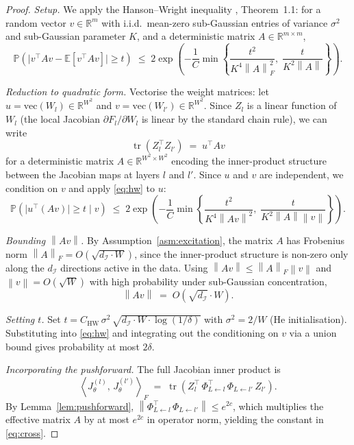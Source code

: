 \documentclass[11pt]{article}
\theoremstyle{plain}
\theoremstyle{definition}
\theoremstyle{remark}
\newcommand{\R}{\mathbb{R}}
\newcommand{\E}{\mathbb{E}}
\newcommand{\Prob}{\mathbb{P}}
\newcommand{\norm}[1]{\left\|#1\right\|}
\newcommand{\inner}[2]{\left\langle #1,\, #2 \right\rangle}
\newcommand{\tr}{\operatorname{tr}}
\newcommand{\dI}{d_{\mathcal{I}}}
\begin{document}
\begin{proof}
\textit{Setup.}
We apply the Hanson--Wright inequality \citep{rudelson2013}, Theorem~1.1:
for a random vector $v\in\R^m$ with i.i.d.\ mean-zero sub-Gaussian entries
of variance $\sigma^2$ and sub-Gaussian parameter $K$, and a deterministic
matrix $A\in\R^{m\times m}$,
\begin{equation}
\label{eq:hw}
  \Prob\!\left(\bigl|v^\top Av - \E[v^\top Av]\bigr|\geq t\right)
  \;\leq\;
  2\exp\!\left(-\frac{1}{C}\min\!\left\{
    \frac{t^2}{K^4\norm{A}_F^2},\;
    \frac{t}{K^2\norm{A}}
  \right\}\right).
\end{equation}

\textit{Reduction to quadratic form.}
Vectorise the weight matrices: let $u=\mathrm{vec}(W_l)\in\R^{W^2}$ and
$v=\mathrm{vec}(W_{l'})\in\R^{W^2}$.  Since $Z_l$ is a linear function of
$W_l$ (the local Jacobian $\partial F_l/\partial W_l$ is linear by the
standard chain rule), we can write
\[
  \tr\!\left(Z_l^\top Z_{l'}\right) \;=\; u^\top A v
\]
for a deterministic matrix $A\in\R^{W^2\times W^2}$ encoding the
inner-product structure between the Jacobian maps at layers $l$ and $l'$.
Since $u$ and $v$ are independent, we condition on $v$ and apply
\eqref{eq:hw} to $u$:
\[
  \Prob\!\left(\bigl|u^\top(Av)\bigr|\geq t\;\Big|\;v\right)
  \;\leq\;
  2\exp\!\left(-\frac{1}{C}\min\!\left\{
    \frac{t^2}{K^4\norm{Av}^2},\;
    \frac{t}{K^2\norm{A}\norm{v}}
  \right\}\right).
\]

\textit{Bounding $\norm{Av}$.}
By Assumption~\ref{asm:excitation}, the matrix $A$ has Frobenius norm
$\norm{A}_F = O\!\left(\sqrt{\dI\cdot W}\right)$, since the inner-product
structure is non-zero only along the $\dI$ directions active in the data.
Using $\norm{Av}\leq\norm{A}_F\norm{v}$ and $\norm{v}=O(\sqrt{W})$ with
high probability under sub-Gaussian concentration,
\[
  \norm{Av} \;=\; O\!\left(\sqrt{\dI}\cdot W\right).
\]

\textit{Setting $t$.}
Set $t = C_{\mathrm{HW}}\,\sigma^2\,\sqrt{\dI\cdot W\cdot\log(1/\delta)}$
with $\sigma^2=2/W$ (He initialisation).
Substituting into \eqref{eq:hw} and integrating out the conditioning on $v$
via a union bound gives probability at most $2\delta$.

\textit{Incorporating the pushforward.}
The full Jacobian inner product is
\[
  \inner{J_\theta^{(l)}}{J_\theta^{(l')}}_F
  \;=\;
  \tr\!\left(Z_l^\top\,\Phi_{L\leftarrow l}^\top\,\Phi_{L\leftarrow l'}\,Z_{l'}\right).
\]
By Lemma~\ref{lem:pushforward},
$\norm{\Phi_{L\leftarrow l}^\top\,\Phi_{L\leftarrow l'}}\leq e^{2c}$,
which multiplies the effective matrix $A$ by at most $e^{2c}$ in operator
norm, yielding the constant in \eqref{eq:cross}.
\end{proof}
\end{document}
